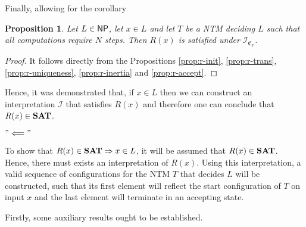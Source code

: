 \documentclass [11pt]{article}
\newtheorem{proposition}[theorem]{Proposition}
\newcommand{\Ra}{\Rightarrow}
\newcommand{\ccfont}[1]{\protect\mathsf{#1}}
\newcommand{\NP}{\ccfont{NP}}
\newcommand{\SAT}{\mbox{\bf SAT}}
\newcommand{\sequint}[2]{ \mathcal{#1}_{\mathfrak{C}_{#2}}}
\begin{document}
Finally, allowing for the corollary
\begin{proposition}
Let $L \in \NP$, let $x \in L$ and let $T$ be a NTM deciding $L$ such that all computations require $N$ steps. Then $R(x)$ is satisfied under $\sequint{I}{x}$.
\end{proposition}
\begin{proof}
It follows directly from the Propositions \ref{prop:r-init}, \ref{prop:r-trans}, \ref{prop:r-uniqueness}, \ref{prop:r-inertia} and \ref{prop:r-accept}.
\end{proof}

\smallskip

Hence, it was demonstrated that, if $x \in L$ then we can construct an interpretation $\mathcal{I}$ that satisfies $R(x)$ and therefore one can conclude that $R(x) \in \SAT$.
\bigskip

$"\Longleftarrow"$

\bigskip


To show that $R(x) \in \SAT \Ra x \in L $, it will be assumed that $R(x) \in \SAT $.  Hence, there must exists an interpretation of $R(x)$. Using this interpretation, a valid sequence of configurations for the NTM $T$ that decides $L$ will be constructed, such that 
its first element will reflect the start configuration of $T$ on input $x$ and the last element will terminate in an accepting state.
   
 
Firstly, some auxiliary results ought to be established.
\end{document}
